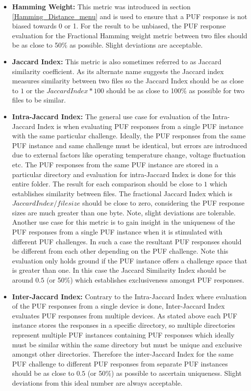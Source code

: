 \begin{itemize}
	\item \textbf{Hamming Weight:} This metric was introduced in section \ref{Hamming_Distance_menu} and is used to ensure that a PUF response is not biased towards 0 or 1. For the result to be unbiased, the PUF response evaluation for the Fractional Hamming weight metric between two files should be as close to 50\% as possible. Slight deviations are acceptable.
	\item \textbf{Jaccard Index:} This metric is also sometimes referred to as Jaccard similarity coefficient. As its alternate name suggests the Jaccard index measures similarity between two files so the Jaccard Index should be as close to $1$ or the $Jaccard Index * 100$ should be as close to 100\% as possible for two files to be similar.
	\item \textbf{Intra-Jaccard Index:} The general use case for evaluation of the Intra-Jaccard Index is when evaluating PUF responses from a single PUF instance with the same particular challenge. Ideally, the PUF responses from the same PUF instance and same challenge must be identical, but errors are introduced due to external factors like operating temperature change, voltage fluctuation etc. The PUF responses from the same PUF instance are stored in a particular directory and evaluation
		for intra-Jaccard Index is done for this entire folder. The result for each comparison should be close to $1$ which establishes similarity between files. The fractional Jaccard Index which is $Jaccard Index / filesize$ should be close to zero, considering the PUF response sizes are much greater than one byte. Note, slight deviations are tolerable. Another use case for this metric is to gain insight in the uniqueness of the PUF responses from a single PUF instance when
		it is stimulated with different PUF challenges. In such a case the resultant PUF responses should be different from each other depending on the PUF challenge. Note this evaluation only holds ground if the PUF instance offers a challenge space that is greater than one. In this case the Jaccard Similarity Index should be around $0.5$ (or 50\%) which establishes exclusiveness amongst PUF responses.
	\item \textbf{Inter-Jaccard Index:} Contrary to the Intra-Jaccard Index where evaluation of the PUF responses from a single device is done, Inter-Jaccard Index evaluates PUF responses from multiple devices. As stated above each PUF instance stores the responses in a specific directory, so multiple directories represent multiple PUF instances containing PUF responses which ideally must be similar within the same directory but must be unique and exclusive amongst other directories.
		Therefore the inter-Jaccard Index for the same PUF challenge to different PUF responses from
		separate PUF instances should be as close to $0.5$ (or 50\%) as possible to ascertain
		uniqueness. Slight deviations from this ideal number are always acceptable.
\end{itemize}

